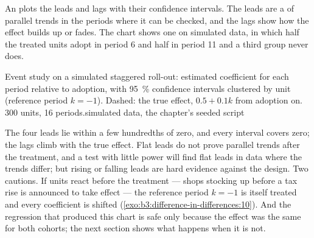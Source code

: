 An  plots the leads and lags with their confidence intervals. The
leads are a  of parallel trends in the periods where it can be
checked, and the lags show how the effect builds up or fades. The chart shows
one on simulated data, in which half the treated units adopt in period 6 and
half in period 11 and a third group never does.

\begin{omchart}{Event study on a simulated staggered roll-out: estimated
coefficient for each period relative to adoption, with 95~\% confidence
intervals clustered by unit (reference period $k = -1$). Dashed: the true
effect, $0.5 + 0.1k$ from adoption on. 300 units, 16 periods.}{simulated data,
the chapter's seeded script}
\end{omchart}

The four leads lie within a few hundredths of zero, and every interval covers
zero; the lags climb with the true effect. %
Flat leads do not prove parallel trends after the treatment, and a test with
little power will find flat leads in data where the trends differ; but rising
or falling leads are hard evidence against the design. Two cautions. If units
react before the treatment --- shops stocking up before a tax rise is announced
to take effect --- the reference period $k = -1$ is itself treated and every
coefficient is shifted (\cref{exo:b3:difference-in-differences:10}). And the
regression that produced this chart is safe only because the effect was the
same for both cohorts; the next section shows what happens when it is not.

